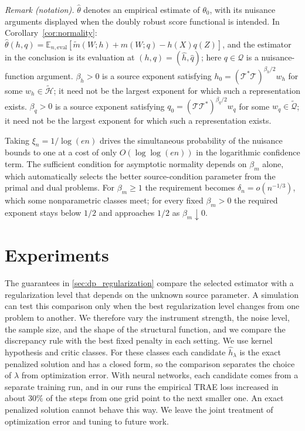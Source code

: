 \documentclass[12pt]{article}
\theoremstyle{plain}
\theoremstyle{definition}
\theoremstyle{remark}
\begin{document}
\noindent\textit{Remark (notation).} $\hat\theta$ denotes an empirical estimate of $\theta_0$, with its nuisance arguments displayed when the doubly robust score functional is intended. In Corollary~\ref{cor:normality}: $\hat\theta(h,q)=\mathbb E_{n,\mathrm{eval}}[\tilde m(W;h)+m(W;q)-h(X)q(Z)]$, and the estimator in the conclusion is its evaluation at $(h,q)=(\hat h,\hat q)$; here $q\in\mathcal Q$ is a nuisance-function argument. $\beta_h>0$ is a source exponent satisfying $h_0=(\mathcal T^*\mathcal T)^{\beta_h/2}w_h$ for some $w_h\in\tilde{\mathcal H}$; it need not be the largest exponent for which such a representation exists. $\beta_q>0$ is a source exponent satisfying $q_0=(\mathcal T\mathcal T^*)^{\beta_q/2}w_q$ for some $w_q\in\tilde{\mathcal Q}$; it need not be the largest exponent for which such a representation exists.

Taking $\xi_n=1/\log(en)$ drives the simultaneous probability of the nuisance bounds to one at a cost of only $O(\log\log(en))$ in the logarithmic confidence term. The sufficient condition for asymptotic normality depends on $\beta_m$ alone, which automatically selects the better source-condition parameter from the primal and dual problems. For $\beta_m\geqslant1$ the requirement becomes $\delta_n=o(n^{-1/3})$, which some nonparametric classes meet; for every fixed $\beta_m>0$ the required exponent stays below $1/2$ and approaches $1/2$ as $\beta_m\downarrow0$.



\section{Experiments}
\label{sec:experiments}

The guarantees in \cref{sec:dp_regularization} compare the selected estimator with a regularization level that depends on the unknown source parameter. A simulation can test this comparison only when the best regularization level changes from one problem to another. We therefore vary the instrument strength, the noise level, the sample size, and the shape of the structural function, and we compare the discrepancy rule with the best fixed penalty in each setting. We use kernel hypothesis and critic classes. For these classes each candidate $\hat h_\lambda$ is the exact penalized solution and has a closed form, so the comparison separates the choice of $\lambda$ from optimization error. With neural networks, each candidate comes from a separate training run, and in our runs the empirical TRAE loss increased in about $30\%$ of the steps from one grid point to the next smaller one. An exact penalized solution cannot behave this way. We leave the joint treatment of optimization error and tuning to future work.
\end{document}
